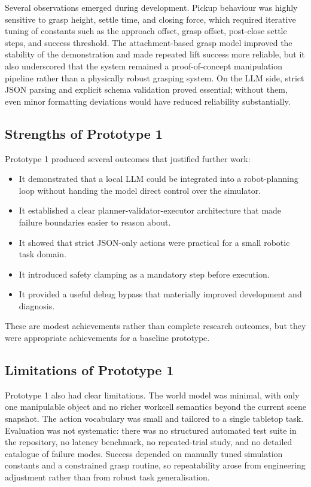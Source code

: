\documentclass[12pt,a4paper]{article}
\begin{document}
Several observations emerged during development. Pickup behaviour was highly sensitive to grasp height, settle time, and closing force, which required iterative tuning of constants such as the approach offset, grasp offset, post-close settle steps, and success threshold. The attachment-based grasp model improved the stability of the demonstration and made repeated lift success more reliable, but it also underscored that the system remained a proof-of-concept manipulation pipeline rather than a physically robust grasping system. On the LLM side, strict JSON parsing and explicit schema validation proved essential; without them, even minor formatting deviations would have reduced reliability substantially.

\subsection{Strengths of Prototype 1}

Prototype 1 produced several outcomes that justified further work:

\begin{itemize}
	\item It demonstrated that a local LLM could be integrated into a robot-planning loop without handing the model direct control over the simulator.
	\item It established a clear planner-validator-executor architecture that made failure boundaries easier to reason about.
	\item It showed that strict JSON-only actions were practical for a small robotic task domain.
	\item It introduced safety clamping as a mandatory step before execution.
	\item It provided a useful debug bypass that materially improved development and diagnosis.
\end{itemize}

These are modest achievements rather than complete research outcomes, but they were appropriate achievements for a baseline prototype.

\subsection{Limitations of Prototype 1}

Prototype 1 also had clear limitations. The world model was minimal, with only one manipulable object and no richer workcell semantics beyond the current scene snapshot. The action vocabulary was small and tailored to a single tabletop task. Evaluation was not systematic: there was no structured automated test suite in the repository, no latency benchmark, no repeated-trial study, and no detailed catalogue of failure modes. Success depended on manually tuned simulation constants and a constrained grasp routine, so repeatability arose from engineering adjustment rather than from robust task generalisation.
\end{document}
